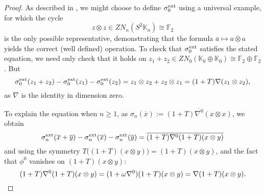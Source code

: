 \documentclass[11pt]{amsart}
\theoremstyle{plain}
\theoremstyle{definition}
\let\oldphi\phi
\let\phi\varphi
\theoremstyle{plain}
\newcommand{\Nabla}{\nabla}
\newcommand{\F}{\mathbb{F}}
\newcommand{\Ftwo}{\F_2}
\begin{document}
\begin{Constructing (co)homotopy operations}
\begin{proof}
As described in \cite[\S3]{MR1089001}, we might choose to define $\sigma^\textup{ext}_0$ using a universal example, for which the cycle 
\[z\otimes z\in ZN_n(S^2\mathbb{K}_n)\cong \Ftwo \]
is the only possible representative, demonstrating that the formula $\overline{a}\mapsto \overline{a\otimes a}$ yields the correct (well defined) operation. To check that $\sigma_0^\textup{ext}$ satisfies the stated equation, we need only check that it holds on $z_1+z_2\in ZN_0(\mathbb{K}_0\oplus \mathbb{K}_0)\cong \Ftwo \oplus \Ftwo $. But
\[\sigma_0^\textup{ext}(z_1+z_2)-\sigma_0^\textup{ext}(z_1)-\sigma_0^\textup{ext}(z_2)=z_1\otimes z_2+z_2\otimes z_1=(1+T)\Nabla(z_1\otimes z_2),\]
as $\Nabla$ is the identity in dimension zero.

To explain the equation when $n\geq1$, as $\sigma_n(\overline{x}):=\overline{(1+T)\Nabla^0(x\otimes x)}$, we obtain %
\[\sigma_n^\textup{ext}(\overline{x}+\overline{y})-\sigma_n^\textup{ext}(\overline{x})-\sigma_n^\textup{ext}(\overline{y})
=
\overline{(1+T)\Nabla^0(1+T)(x\otimes y)}\]
and using the symmetry  $T\bigl((1+T)(x\otimes y)\bigr)=(1+T)(x\otimes y)$, and the fact that $\oldphi^0$ vanishes on $(1+T)(x\otimes y)$:
\[
(1+T)\Nabla^0(1+T)(x\otimes y)
=
(1+\omega\Nabla^0)(1+T)(x\otimes y)
=
\Nabla(1+T)(x\otimes y).\qedhere
\]
\end{proof}


\end{Constructing (co)homotopy operations}
\end{document}
